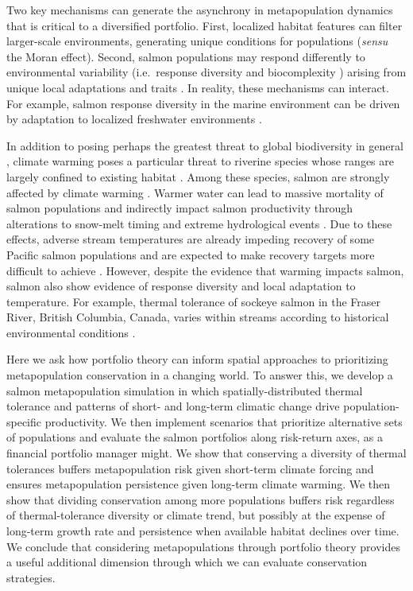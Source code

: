 \documentclass[12pt,english]{article}
\begin{document}
\begin{spacing}{1.9}
Two key mechanisms can generate the asynchrony in metapopulation dynamics that is critical to a diversified portfolio. First, localized habitat features can filter larger-scale environments, generating unique conditions for populations \citep{schindler2008} (\emph{sensu} the Moran effect). Second, salmon populations may respond differently to environmental variability (i.e.~response diversity \citep{elmqvist2003} and biocomplexity \citep{hilborn2003}) arising from unique local adaptations and traits \citep{fraser2011, eliason2011, thorson2014}. In reality, these mechanisms can interact. For example, salmon response diversity in the marine environment can be driven by adaptation to localized freshwater environments \citep{johnson2013a}.

In addition to posing perhaps the greatest threat to global biodiversity in general \citep{thomas2004}, climate warming poses a particular threat to riverine species whose ranges are largely confined to existing habitat \citep{thomas2010}. Among these species, salmon are strongly affected by climate warming \citep[e.g.][]{patterson2007}. Warmer water can lead to massive mortality of salmon populations \citep[e.g.][]{patterson2007} and indirectly impact salmon productivity through alterations to snow-melt timing and extreme hydrological events \citep{crozier2008}. Due to these effects, adverse stream temperatures are already impeding recovery of some Pacific salmon populations \citep{mccullough1999} and are expected to make recovery targets more difficult to achieve \citep{battin2007}. However, despite the evidence that warming impacts salmon, salmon also show evidence of response diversity and local adaptation to temperature. For example, thermal tolerance of sockeye salmon in the Fraser River, British Columbia, Canada, varies within streams according to historical environmental conditions \citep{eliason2011}.

Here we ask how portfolio theory can inform spatial approaches to prioritizing metapopulation conservation in a changing world. To answer this, we develop a salmon metapopulation simulation in which spatially-distributed thermal tolerance and patterns of short- and long-term climatic change drive population-specific productivity. We then implement scenarios that prioritize alternative sets of populations and evaluate the salmon portfolios along risk-return axes, as a financial portfolio manager might. We show that conserving a diversity of thermal tolerances buffers metapopulation risk given short-term climate forcing and ensures metapopulation persistence given long-term climate warming. We then show that dividing conservation among more populations buffers risk regardless of thermal-tolerance diversity or climate trend, but possibly at the expense of long-term growth rate and persistence when available habitat declines over time. We conclude that considering metapopulations through portfolio theory provides a useful additional dimension through which we can evaluate conservation strategies.


\end{spacing}
\end{document}
